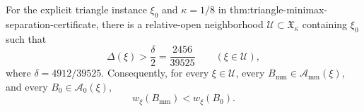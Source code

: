 For the explicit triangle instance \(\xi_0\) and \(\kappa=1/8\) in thm:triangle-minimax-separation-certificate, there is a relative-open neighborhood \(\mathcal U\subset\mathfrak X_\kappa\) containing \(\xi_0\) such that
\[
\Delta(\xi)>\frac{\delta}{2}=\frac{2456}{39525}
\qquad(\xi\in\mathcal U),
\]
where \(\delta=4912/39525\).  Consequently, for every \(\xi\in\mathcal U\), every \(B_{\mathrm{mm}}\in\mathcal A_{\mathrm{mm}}(\xi)\), and every \(B_0\in\mathcal A_0(\xi)\),
\[
w_\xi(B_{\mathrm{mm}})<w_\xi(B_0).
\]